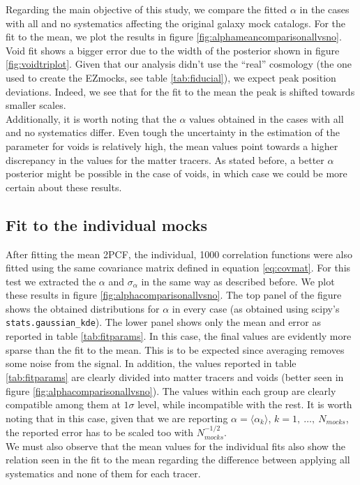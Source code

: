 \documentclass[fleqn, usenatbib]{mnras}
\begin{document}
Regarding the main objective of this study, we compare the fitted $\alpha$ in the cases with all and no systematics affecting the original galaxy mock catalogs. For the fit to the mean, we plot the results in figure \ref{fig:alphameancomparisonallvsno}. Void fit shows a bigger error due to the width of the posterior shown in figure \ref{fig:voidtriplot}. Given that our analysis didn't use the ``real'' cosmology (the one used to create the EZmocks, see table \ref{tab:fiducial}), we expect peak position deviations. Indeed, we see that for the fit to the mean the peak is shifted towards smaller scales.\\
Additionally, it is worth noting that the $\alpha$ values obtained in the cases with all and no systematics differ. Even tough the uncertainty in the estimation of the parameter for voids is relatively high, the mean values point towards a higher discrepancy in the values for the matter tracers. As stated before, a better $\alpha$ posterior might be possible in the case of voids, in which case we could be more certain about these results.
\subsection{Fit to the individual mocks}
After fitting the mean 2PCF, the individual, 1000 correlation functions were also fitted using the same covariance matrix defined in equation \ref{eq:covmat}. For this test we extracted the $\alpha$ and $\sigma_\alpha$ in the same way as described before. We plot these results in figure \ref{fig:alphacomparisonallvsno}. The top panel of the figure shows the obtained distributions for $\alpha$ in every case (as obtained using scipy's \texttt{stats.gaussian\_kde}). The lower panel shows only the mean and error as reported in table \ref{tab:fitparams}. In this case, the final values are evidently more sparse than the fit to the mean. This is to be expected since averaging removes some noise from the signal. In addition, the values reported in table \ref{tab:fitparams} are clearly divided into matter tracers and voids (better seen in figure \ref{fig:alphacomparisonallvsno}). The values within each group are clearly compatible among them at $1\sigma$ level, while incompatible with the rest. It is worth noting that in this case, given that we are reporting $\alpha = \langle\alpha_k\rangle$, $k=1,\ \dots,\ N_{mocks}$, the reported error has to be scaled too with $N_{mocks}^{-1/2}$.\\
We must also observe that the mean values for the individual fits also show the relation seen in the fit to the mean regarding the difference between applying all systematics and none of them for each tracer.
\end{document}
